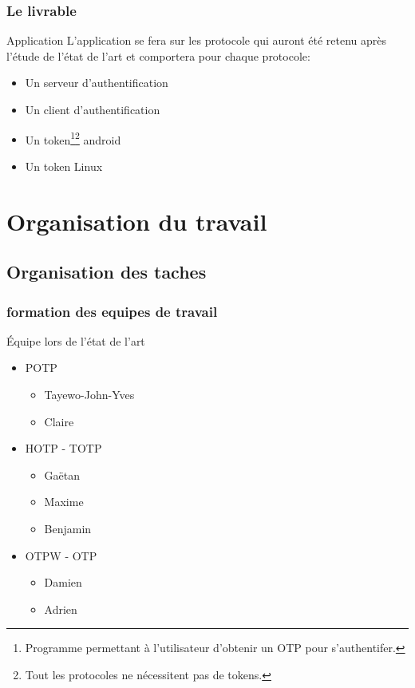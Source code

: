 \documentclass{beamer}
\begin{document}
\begin{frame}
\frametitle{Le livrable}
\begin{block}{Application}
    L'application se fera sur les protocole qui auront été retenu après l'étude de 
  l'état de l'art et comportera pour chaque protocole:
  \begin{itemize}
    \item Un serveur d'authentification
    \item Un client d'authentification
    \item Un token\footnote[1]{Programme permettant à l'utilisateur d'obtenir un 
      OTP pour s'authentifer.}\footnote[2]{Tout les protocoles ne 
      nécessitent pas de tokens.} android
    \item Un token Linux
  \end{itemize}
\end{block}

\end{frame}


\section{Organisation du travail}

\subsection{Organisation des taches}
\begin{frame}
\frametitle{formation des equipes de travail}
\begin{block}{Équipe lors de l'état de l'art}
  \begin{itemize}
    \item POTP
    \begin{itemize}
      \item Tayewo-John-Yves 
      \item Claire 
    \end{itemize}
    \item HOTP - TOTP
    \begin{itemize}
      \item Gaëtan 
      \item Maxime 
      \item Benjamin 
    \end{itemize}
    \item OTPW - OTP
    \begin{itemize}
      \item Damien 
      \item Adrien 
    \end{itemize}
  \end{itemize}
\end{block}
\end{frame}
\end{document}
